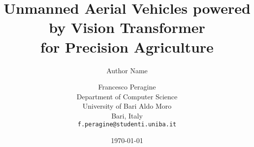 \documentclass[10pt,twocolumn,letterpaper]{article}
\begin{document}
\title{Unmanned Aerial Vehicles powered by Vision Transformer\\ for Precision Agriculture}
\author{Author Name}
\date{\today}


\author{Francesco Peragine\\
Department of Computer Science\\
University of Bari Aldo Moro\\
Bari, Italy\\
{\tt\small f.peragine@studenti.uniba.it}}

\maketitle
\pagestyle{empty}
\newpage
{} 
\pagestyle{plain}
\setcounter{page}{1}

    







{
    \small
    
    
}
\end{document}

